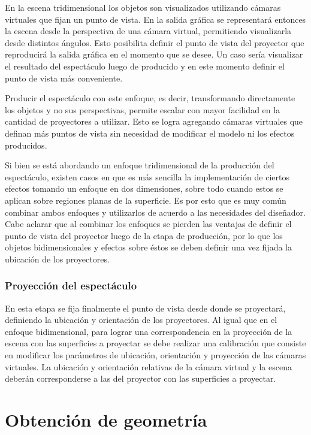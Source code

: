 En la escena tridimensional los objetos son visualizados utilizando cámaras virtuales que fijan un punto de vista. En la salida gráfica se representará entonces la escena desde la perspectiva de una cámara virtual, permitiendo visualizarla desde distintos ángulos. Esto posibilita definir el punto de vista del proyector que reproducirá la salida gráfica en el momento que se desee. Un caso sería visualizar el resultado del espectáculo luego de producido y en este momento definir el punto de vista más conveniente.

Producir el espectáculo con este enfoque, es decir, transformando directamente los objetos y no sus perspectivas, permite escalar con mayor facilidad en la cantidad de proyectores a utilizar. Esto se logra agregando cámaras virtuales que definan más puntos de vista sin necesidad de modificar el modelo ni los efectos producidos.

Si bien se está abordando un enfoque tridimensional de la producción del espectáculo, existen casos en que es más sencilla la implementación de ciertos efectos tomando un enfoque en dos dimensiones, sobre todo cuando estos se aplican sobre regiones planas de la superficie. Es por esto que es muy común combinar ambos enfoques y utilizarlos de acuerdo a las necesidades del diseñador. Cabe aclarar que al combinar los enfoques se pierden las ventajas de definir el punto de vista del proyector luego de la etapa de producción, por lo que los objetos bidimensionales y efectos sobre éstos se deben definir una vez fijada la ubicación de los proyectores.

\subsubsection{Proyección del espectáculo}

En esta etapa se fija finalmente el punto de vista desde donde se proyectará, definiendo la ubicación y orientación de los proyectores.
Al igual que en el enfoque bidimensional, para lograr una correspondencia en la proyección de la escena con las superficies a proyectar se debe realizar una calibración que consiste en modificar los parámetros de ubicación, orientación y proyección de las cámaras virtuales.
La ubicación y orientación relativas de la cámara virtual y la escena deberán corresponderse a las del proyector con las superficies a proyectar.


\section{Obtención de geometría}

